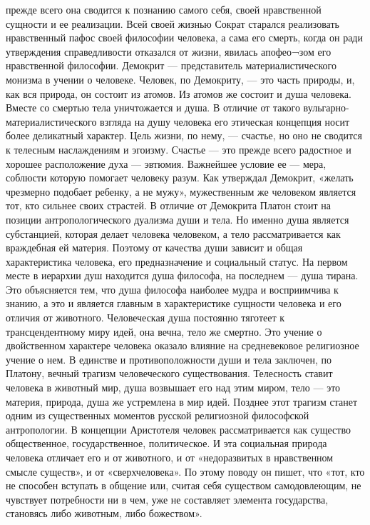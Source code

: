 \documentclass[12pt]{article}
\begin{document}
прежде всего она сводится к познанию самого себя, своей нравственной сущности и ее реализации.
Всей своей жизнью Сократ старался реализовать нравственный пафос своей философии человека, а сама его
смерть, когда он ради утверждения справедливости отказался от жизни, явилась апофео¬зом его нравственной
философии.
Демокрит — представитель материалистического монизма в учении о человеке. Человек, по Демокриту, — это
часть природы, и, как вся природа, он состоит из атомов. Из атомов же состоит и душа человека. Вместе со
смертью тела уничтожается и душа. В отличие от такого вульгарно-материалистического взгляда на душу
человека его этическая концепция носит более деликатный характер. Цель жизни, по нему, — счастье, но оно не
сводится к телесным наслаждениям и эгоизму. Счастье — это прежде всего радостное и хорошее расположение
духа — эвтюмия. Важнейшее условие ее — мера, соблюсти которую помогает человеку разум. Как утверждал
Демокрит, «желать чрезмерно подобает ребенку, а не мужу», мужественным же человеком является тот, кто
сильнее своих страстей.
В отличие от Демокрита Платон стоит на позиции антропологического дуализма души и тела. Но именно душа
является субстанцией, которая делает человека человеком, а тело рассматривается как враждебная ей материя.
Поэтому от качества души зависит и общая характеристика человека, его предназначение и социальный статус.
На первом месте в иерархии душ находится душа философа, на последнем — душа тирана. Это объясняется
тем, что душа философа наиболее мудра и восприимчива к знанию, а это и является главным в характеристике
сущности человека и его отличия от животного.
Человеческая душа постоянно тяготеет к трансцендентному миру идей, она вечна, тело же смертно. Это учение
о двойственном характере человека оказало влияние на средневековое религиозное учение о нем. В единстве и
противоположности души и тела заключен, по Платону, вечный трагизм человеческого существования.
Телесность ставит человека в животный мир, душа возвышает его над этим миром, тело — это материя,
природа, душа же устремлена в мир идей. Позднее этот трагизм станет одним из существенных моментов
русской религиозной философской антропологии.
В концепции Аристотеля человек рассматривается как существо общественное, государственное, политическое.
И эта социальная природа человека отличает его и от животного, и от «недоразвитых в нравственном смысле
существ», и от «сверхчеловека». По этому поводу он пишет, что «тот, кто не способен вступать в общение или,
считая себя существом самодовлеющим, не чувствует потребности ни в чем, уже не составляет элемента
государства, становясь либо животным, либо божеством».
\end{document}
